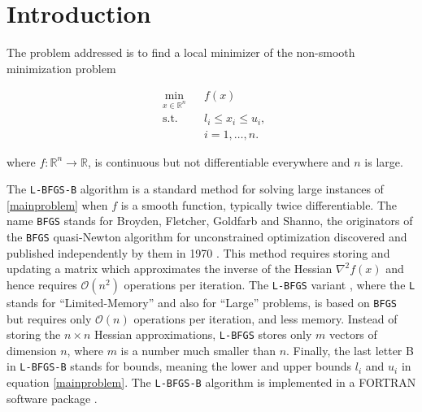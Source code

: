 
\chapter{Introduction} %

\label{Chapter1} %


The problem addressed is to find a local minimizer of the non-smooth minimization problem

\begin{equation} \label{mainproblem}
  \begin{aligned}
    & \underset{x \in \mathbb{R}^n}{\text{min}}
    & & f(x) \\
    & \text{s.t.}
    & & l_i \leq x_i \leq u_i , \; \\
    & & & i = 1, \ldots, n.
  \end{aligned}
\end{equation}

where $f \colon \mathbb{R}^n \to \mathbb{R}$, is continuous but not differentiable everywhere and $n$ is large.

The \texttt{L-BFGS-B} algorithm \citep{lbfgsboriginal} is a standard method for solving large instances of \eqref{mainproblem} when $f$ is a smooth function, typically twice differentiable. The name \texttt{BFGS} stands for Broyden, Fletcher, Goldfarb and Shanno, the originators
of the \texttt{BFGS} quasi-Newton algorithm for unconstrained
optimization discovered and published
independently by them in 1970 \citep{Broyden, Fletcher, Goldfarb, Shanno}.
This method requires storing and updating a matrix which 
approximates the inverse of the Hessian $\nabla^2 f(x)$ and
hence requires $\mathcal{O}(n^2)$ operations per iteration.  
The \texttt{L-BFGS} variant \citep{MR572855}, where the \texttt{L} stands for ``Limited-Memory'' and also for ``Large'' problems, is based on \texttt{BFGS} but requires only $\mathcal{O}(n)$ operations per iteration, and less memory. Instead of storing the $n \times n$ Hessian approximations, \texttt{L-BFGS} stores only $m$ vectors of dimension $n$, where $m$ is a number much smaller than $n$. Finally, the last letter B in 
\texttt{L-BFGS-B} stands for bounds, meaning the lower and upper
bounds $l_i$ and $u_i$ in equation \eqref{mainproblem}.  The \texttt{L-BFGS-B} algorithm is implemented in a FORTRAN software package \citep{lbfgsbsoftware}.

